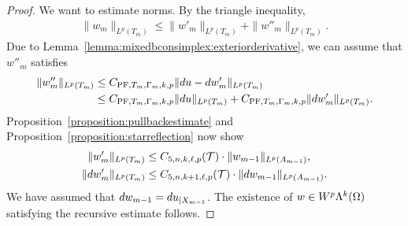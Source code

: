 \documentclass[10pt,a4paper]{article}
\begin{document}
\begin{proof}
    We want to estimate norms. By the triangle inequality, 
    \begin{align*}
        \| w_{m} \|_{L^{p}(T_{m})}
        \leq  
        \| w'_{m} \|_{L^{p}(T_{m})}
        + 
        \| w''_{m} \|_{L^{p}(T_{m})}
        .
    \end{align*}
    Due to Lemma~\ref{lemma:mixedbconsimplex:exteriorderivative},
    we can assume that $w''_{m}$ satisfies 
    \begin{align*}
        \| w''_{m} \|_{L^{p}(T_{m})} 
        &
        \leq 
        C_{{\rm PF},T_{m},\Gamma_{m},k,p} \| d u - d w'_{m} \|_{L^{p}(T_{m})}
        \\&
        \leq 
        C_{{\rm PF},T_{m},\Gamma_{m},k,p} \| d u      \|_{L^{p}(T_{m})} 
        + 
        C_{{\rm PF},T_{m},\Gamma_{m},k,p} \| d w'_{m} \|_{L^{p}(T_{m})} 
        .
    \end{align*}
    Proposition~\ref{proposition:pullbackestimate} and Proposition~\ref{proposition:starreflection} now show 
    \begin{align*}
        \| w'_{m} \|_{L^{p}(T_{m})}
        &\leq 
        C_{5,n,k,\ell,p}({\mathcal T})
        \cdot 
        \| w_{m-1} \|_{L^{p}(A_{m-1})}
        ,
        \\
        \| d w'_{m} \|_{L^{p}(T_{m})}
        &\leq 
        C_{5,n,k+1,\ell,p}({\mathcal T})
        \cdot 
        \| d w_{m-1} \|_{L^{p}(A_{m-1})}
        .
    \end{align*}
    We have assumed that $d w_{m-1} = d u_{|X_{m-1}}$. 
    The existence of $w \in W^{p}\Lambda^{k}(\Omega)$ satisfying the recursive estimate follows. 
\end{proof}
\end{document}
